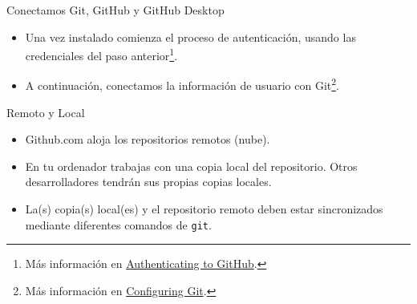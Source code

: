 \documentclass[xcolor={usenames,svgnames,dvipsnames}]{beamer}
\begin{document}
\begin{frame}[label={sec:org6f19e8b}]{Conectamos Git, GitHub y GitHub Desktop}
\begin{itemize}
\item Una vez instalado comienza el proceso de autenticación, usando las credenciales del paso anterior\footnote{Más información en \href{https://help.github.com/desktop/guides/getting-started-with-github-desktop/authenticating-to-github/}{Authenticating to GitHub}.}.
\end{itemize}

\begin{center}
\end{center}


\begin{itemize}
\item A continuación, conectamos la información de usuario con Git\footnote{Más información en \href{https://help.github.com/desktop/guides/getting-started-with-github-desktop/configuring-git-for-github-desktop/}{Configuring Git}.}.
\end{itemize}

\begin{center}
\end{center}
\end{frame}

\begin{frame}[fragile,label={sec:orgad684ca}]{Remoto y Local}
 \begin{itemize}
\item \alert{Github.com} aloja los \alert{repositorios remotos} (nube).
\item En tu ordenador trabajas con una \alert{copia local} del repositorio. Otros desarrolladores tendrán sus propias copias locales.
\item La(s) copia(s) local(es) y el repositorio remoto deben estar \alert{sincronizados} mediante diferentes comandos de \texttt{git}.
\end{itemize}
\end{frame}
\end{document}
